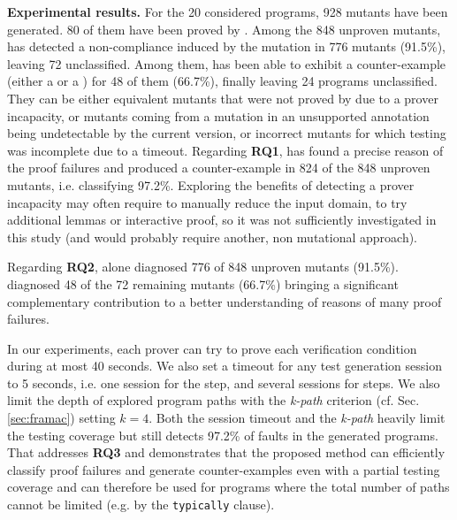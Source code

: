 \textbf{Experimental results.}
For the 20 considered programs, 928 mutants have been generated. 80 of them 
have been proved by \Wp.
Among the 848 unproven mutants, \NCD has detected a non-compliance
induced by the mutation in 776 mutants (91.5\%),
leaving 72 unclassified.
Among them, \CWD has been able to exhibit a counter-example (either a \NCCE or a
\CWCE)
for 48 of them (66.7\%), finally leaving 24 programs unclassified.
They can be either equivalent mutants that were not proved
by \Wp due to a prover incapacity, or mutants coming from a mutation 
in an unsupported annotation being undetectable by the
current version, or incorrect mutants for which testing was incomplete due to a timeout.
Regarding \textbf{RQ1}, \stady has found a precise reason
of the proof failures  and produced a counter-example 
in 824 of the 848 unproven mutants, 
i.e. classifying 97.2\%.
Exploring the benefits of detecting a prover incapacity may often require to manually reduce
the input domain, to try additional lemmas or interactive proof, so it   
was not sufficiently investigated in this study 
(and would probably require another, non mutational approach).

Regarding \textbf{RQ2}, 
\NCD alone diagnosed 776 of 848 unproven mutants (91.5\%).
\CWD diagnosed 48 of the 72 remaining  mutants (66.7\%)
bringing a significant complementary contribution 
to a better understanding of reasons of many proof failures.

In our experiments,
each prover can try to prove each verification condition 
during at most 40 seconds.
We also set a timeout for any test generation session
to 5 seconds, i.e. one session for the \NCD step, and 
several sessions for \CWD steps.
We also limit the depth of explored program paths with the 
{\em k-path} criterion (cf. Sec. \ref{sec:framac})
setting $k = 4$.
Both the session timeout and the {\em k-path} heavily limit the testing coverage
but \stady still detects 97.2\% of faults in the generated programs.
That addresses \textbf{RQ3} and demonstrates that the proposed method can efficiently 
classify proof failures and generate counter-examples
even with a partial testing coverage and can therefore 
be used for programs where the 
total number of paths cannot be limited
(e.g. by the \lstinline{typically} clause).


